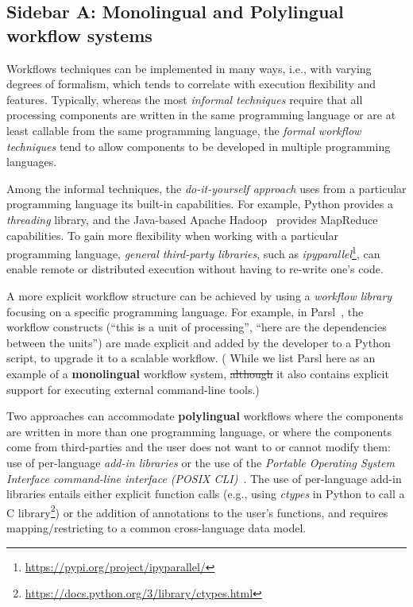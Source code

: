 \documentclass[sigconf,revew,screen,timestamp,nonacm]{acmart}
\newcommand{\modification}[1]{{\color{blue} #1}}
\newcommand{\deletion}[1]{{\color{red} \sout{#1}}}
\begin{document}


\subsection{Sidebar A: Monolingual and Polylingual workflow systems} \label{sec:sidebar:a}

Workflows techniques can be implemented in many ways, i.e., with varying degrees of formalism, which tends to correlate with execution flexibility and features. Typically, whereas the most \textit{informal techniques} require that all processing components are written in the same programming language or are at least callable from the same programming language, the \textit{formal workflow techniques} tend to allow components to be developed in multiple programming languages. 

Among the informal techniques, the \textit{do-it-yourself approach} uses from a particular programming language its built-in capabilities. For example, Python provides a \emph{threading} library, and the Java-based Apache Hadoop~\cite{taylor_overview_2010} provides MapReduce capabilities. To gain more flexibility when working with a particular programming language, \textit{general third-party libraries}, such as \emph{ipyparallel}\footnote{\url{https://pypi.org/project/ipyparallel/}}, can enable remote or distributed execution without having to re-write one's code.

A more explicit workflow structure can be achieved by using a \textit{workflow library} focusing on a specific programming language. For example, in Parsl~\cite{babuji_parsl_2019}, the workflow constructs (``this is a unit of processing'', ``here are the dependencies between the units'') are made explicit and added by the developer to a Python script, to upgrade it to a scalable workflow. (\modification{While we list Parsl here} as an example of a \textbf{monolingual} workflow system, \deletion{although} it also contains explicit support for executing external command-line tools.)

Two approaches can accommodate \textbf{polylingual} workflows where the components are written in more than one programming language, or where the components come from third-parties and the user does not want to or cannot modify them: use of per-language \textit{add-in libraries} or the use of the \textit{Portable Operating System Interface command-line interface (POSIX CLI)}~\cite{the_austin_group_posix1-2008_2008}. The use of per-language add-in libraries entails either explicit function calls (e.g., using \emph{ctypes} in Python to call a C library\footnote{\url{https://docs.python.org/3/library/ctypes.html}}) or the addition of annotations to the user's functions, and requires mapping/restricting to a common cross-language data model.
\end{document}
